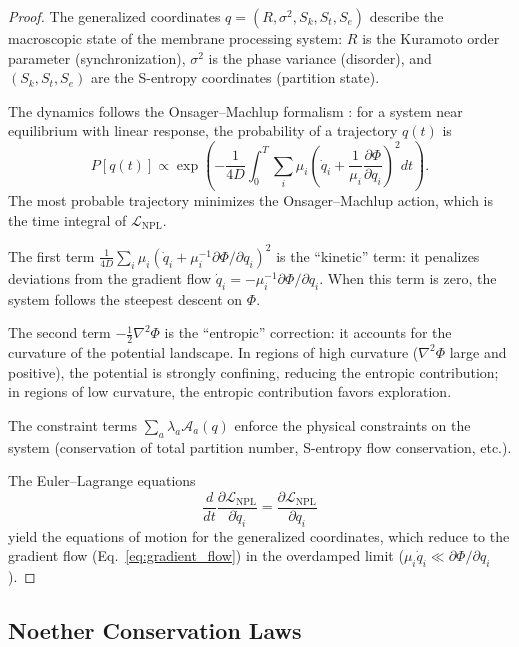 \documentclass[twocolumn,10pt]{article}
\theoremstyle{remark}
\newcommand{\Sk}{S_k}
\newcommand{\St}{S_t}
\newcommand{\Se}{S_e}
\newcommand{\NPL}{\mathcal{L}_{\mathrm{NPL}}}
\begin{document}
\begin{proof}
The generalized coordinates $q = (R, \sigma^2, \Sk, \St, \Se)$ describe the macroscopic state of the membrane processing system: $R$ is the Kuramoto order parameter (synchronization), $\sigma^2$ is the phase variance (disorder), and $(\Sk, \St, \Se)$ are the S-entropy coordinates (partition state).

The dynamics follows the Onsager--Machlup formalism \cite{onsager1953}: for a system near equilibrium with linear response, the probability of a trajectory $q(t)$ is
\begin{equation}
P[q(t)] \propto \exp\!\left(-\frac{1}{4D} \int_0^T \sum_i \mu_i \!\left(\dot{q}_i + \frac{1}{\mu_i}\frac{\partial\Phi}{\partial q_i}\right)^{\!2} dt\right).
\end{equation}
The most probable trajectory minimizes the Onsager--Machlup action, which is the time integral of $\NPL$.

The first term $\frac{1}{4D}\sum_i \mu_i(\dot{q}_i + \mu_i^{-1}\partial\Phi/\partial q_i)^2$ is the ``kinetic'' term: it penalizes deviations from the gradient flow $\dot{q}_i = -\mu_i^{-1}\partial\Phi/\partial q_i$. When this term is zero, the system follows the steepest descent on $\Phi$.

The second term $-\frac{1}{2}\nabla^2\Phi$ is the ``entropic'' correction: it accounts for the curvature of the potential landscape. In regions of high curvature ($\nabla^2\Phi$ large and positive), the potential is strongly confining, reducing the entropic contribution; in regions of low curvature, the entropic contribution favors exploration.

The constraint terms $\sum_a \lambda_a \mathcal{A}_a(q)$ enforce the physical constraints on the system (conservation of total partition number, S-entropy flow conservation, etc.).

The Euler--Lagrange equations
\begin{equation}
\frac{d}{dt}\frac{\partial\NPL}{\partial\dot{q}_i} = \frac{\partial\NPL}{\partial q_i}
\end{equation}
yield the equations of motion for the generalized coordinates, which reduce to the gradient flow (Eq.~\ref{eq:gradient_flow}) in the overdamped limit ($\mu_i \dot{q}_i \ll \partial\Phi/\partial q_i$).
\end{proof}

\subsection{Noether Conservation Laws}
\end{document}
